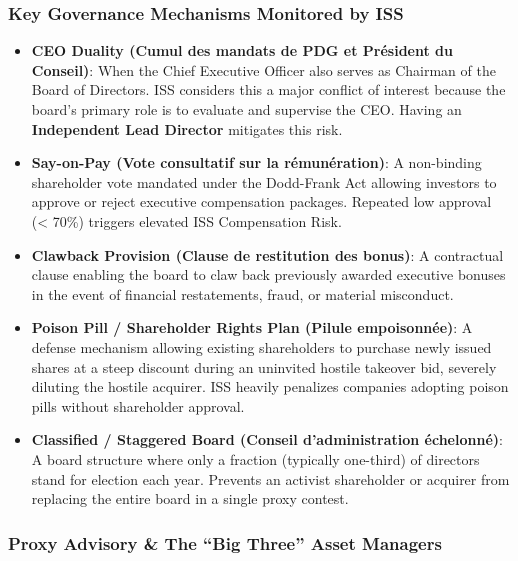 \documentclass[
]{article}
\providecommand{\tightlist}{%
  \setlength{\itemsep}{0pt}\setlength{\parskip}{0pt}}
\begin{document}
\subsubsection{Key Governance Mechanisms Monitored by
ISS}\label{key-governance-mechanisms-monitored-by-iss}

\begin{itemize}
\tightlist
\item
  \textbf{CEO Duality (Cumul des mandats de PDG et Président du
  Conseil)}: When the Chief Executive Officer also serves as Chairman of
  the Board of Directors. ISS considers this a major conflict of
  interest because the board's primary role is to evaluate and supervise
  the CEO. Having an \textbf{Independent Lead Director} mitigates this
  risk.
\item
  \textbf{Say-on-Pay (Vote consultatif sur la rémunération)}: A
  non-binding shareholder vote mandated under the Dodd-Frank Act
  allowing investors to approve or reject executive compensation
  packages. Repeated low approval (\textless{} 70\%) triggers elevated
  ISS Compensation Risk.
\item
  \textbf{Clawback Provision (Clause de restitution des bonus)}: A
  contractual clause enabling the board to claw back previously awarded
  executive bonuses in the event of financial restatements, fraud, or
  material misconduct.
\item
  \textbf{Poison Pill / Shareholder Rights Plan (Pilule empoisonnée)}: A
  defense mechanism allowing existing shareholders to purchase newly
  issued shares at a steep discount during an uninvited hostile takeover
  bid, severely diluting the hostile acquirer. ISS heavily penalizes
  companies adopting poison pills without shareholder approval.
\item
  \textbf{Classified / Staggered Board (Conseil d'administration
  échelonné)}: A board structure where only a fraction (typically
  one-third) of directors stand for election each year. Prevents an
  activist shareholder or acquirer from replacing the entire board in a
  single proxy contest.
\end{itemize}

\subsubsection{Proxy Advisory \& The ``Big Three'' Asset
Managers}\label{proxy-advisory-the-big-three-asset-managers}
\end{document}
